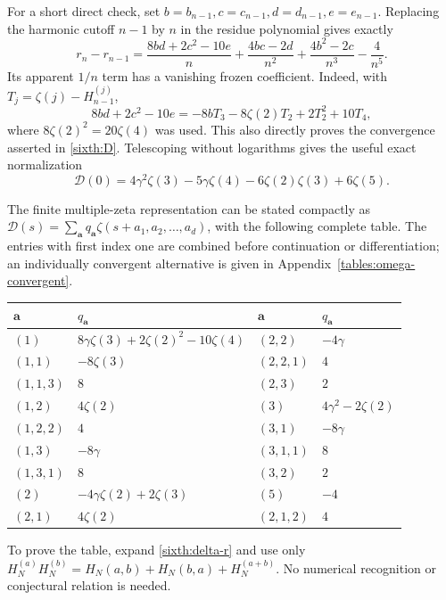 \documentclass[11pt,a4paper]{article}
\numberwithin{equation}{section}
\theoremstyle{definition}
\theoremstyle{remark}
\begin{document}
For a short direct check, set $b=b_{n-1},c=c_{n-1},d=d_{n-1},e=e_{n-1}$.
Replacing the harmonic cutoff $n-1$ by $n$ in the residue polynomial
gives exactly
\begin{equation}\label{sixth:delta-r}
 r_n-r_{n-1}=
 \frac{8bd+2c^2-10e}{n}
 +\frac{4bc-2d}{n^2}
 +\frac{4b^2-2c}{n^3}-\frac4{n^5}.
\end{equation}
Its apparent $1/n$ term has a vanishing frozen coefficient.
Indeed, with $T_j=\zeta(j)-H_{n-1}^{(j)}$,
\begin{equation}\label{sixth:tail-cancel}
 8bd+2c^2-10e=-8bT_3-8\zeta(2)T_2+2T_2^2+10T_4,
\end{equation}
where $8\zeta(2)^2=20\zeta(4)$ was used.
This also directly proves the convergence asserted in
\eqref{sixth:D}.
Telescoping without logarithms gives the useful exact normalization
\begin{equation}\label{sixth:Dzero}
 \mathcal D(0)=4\gamma^2\zeta(3)-5\gamma\zeta(4)
                 -6\zeta(2)\zeta(3)+6\zeta(5).
\end{equation}

The finite multiple-zeta representation can be stated compactly as
$\mathcal D(s)=\sum_{\boldsymbol a}q_{\boldsymbol a}
\zeta(s+a_1,a_2,\ldots,a_d)$, with the following complete table.
The entries with first index one are combined before continuation
or differentiation; an individually convergent alternative is given
in Appendix~\ref{tables:omega-convergent}.

\begin{center}
\small
\begin{tabular}{@{}ll@{\qquad}ll@{}}
\toprule
$\boldsymbol a$ & $q_{\boldsymbol a}$ & $\boldsymbol a$ & $q_{\boldsymbol a}$\\
\midrule
$(1)$ & $8\gamma\zeta(3)+2\zeta(2)^2-10\zeta(4)$
 & $(2,2)$ & $-4\gamma$\\
$(1,1)$ & $-8\zeta(3)$ & $(2,2,1)$ & $4$\\
$(1,1,3)$ & $8$ & $(2,3)$ & $2$\\
$(1,2)$ & $4\zeta(2)$ & $(3)$ & $4\gamma^2-2\zeta(2)$\\
$(1,2,2)$ & $4$ & $(3,1)$ & $-8\gamma$\\
$(1,3)$ & $-8\gamma$ & $(3,1,1)$ & $8$\\
$(1,3,1)$ & $8$ & $(3,2)$ & $2$\\
$(2)$ & $-4\gamma\zeta(2)+2\zeta(3)$ & $(5)$ & $-4$\\
$(2,1)$ & $4\zeta(2)$ & $(2,1,2)$ & $4$\\
\bottomrule
\end{tabular}
\end{center}
To prove the table, expand \eqref{sixth:delta-r} and use only
$H_N^{(a)}H_N^{(b)}=H_N(a,b)+H_N(b,a)+H_N^{(a+b)}$.
No numerical recognition or conjectural relation is needed.
\end{document}
